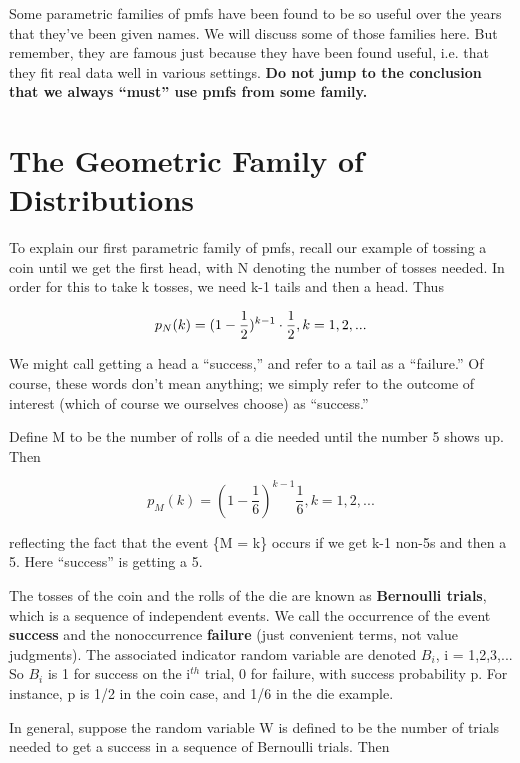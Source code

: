 Some parametric families of pmfs have been found to be so useful over
the years that they've been given names.  We will discuss some of those
families here.  But remember, they are famous just because they have
been found useful, i.e. that they fit real data well in various
settings.  {\bf Do not jump to the conclusion that we always ``must''
use pmfs from some family.}

\section{The Geometric Family of Distributions}
\label{geom}

To explain our first parametric family of pmfs, recall our example of
tossing a coin until we get the first head, with N denoting the number
of tosses needed.  In order for this to take k tosses, we need k-1 tails
and then a head.  Thus

\begin{equation}
p_N(k) = \large (1 - \frac{1}{2} \large )^{k-1} \cdot \frac{1}{2}, k = 1,2,...
\end{equation}

We might call getting a head a ``success,'' and refer to a tail as a
``failure.''  Of course, these words don't mean anything; we simply
refer to the outcome of interest (which of course we ourselves choose)
as ``success.''

Define M to be the number of rolls of a die needed until the number 5
shows up.  Then

\begin{equation}  
p_M(k) = \left (1 - \frac{1}{6} \right )^{k-1} \frac{1}{6}, k = 1,2,...
\end{equation}

reflecting the fact that the event \{M = k\} occurs if we get k-1 non-5s
and then a 5.  Here ``success'' is getting a 5.

The tosses of the coin and the rolls of the die are known as {\bf
Bernoulli trials}, which is a sequence of independent events.  We call
the occurrence of the event {\bf success} and the nonoccurrence {\bf
failure} (just convenient terms, not value judgments).  The associated
indicator random variable are denoted $B_i$, i = 1,2,3,...  So $B_i$ is
1 for success on the i$^{th}$ trial, 0 for failure, with success
probability p.  For instance, p is 1/2 in the coin case, and 1/6 in the
die example.  

In general, suppose the random variable W is defined to be the number 
of trials needed to get a success in a sequence of Bernoulli trials.
Then

